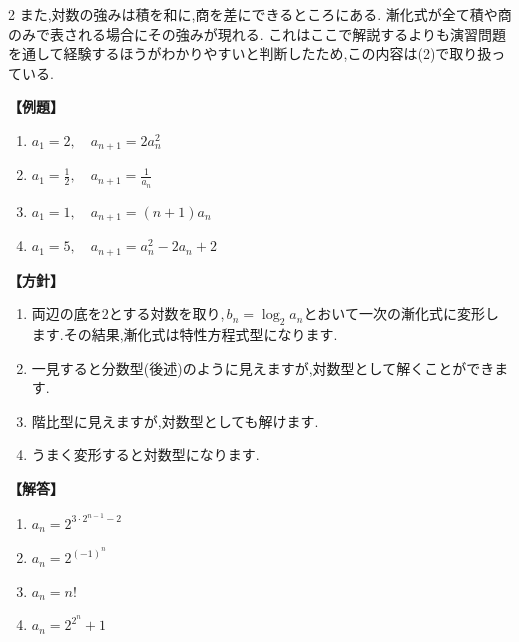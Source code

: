\documentclass[dvipdfmx,a4paper,11pt,fleqn,openany]{jsbook}
\begin{document}
\begin{multicols*}{2}
    また,対数の強みは積を和に,商を差にできるところにある.
    漸化式が全て積や商のみで表される場合にその強みが現れる.
    これはここで解説するよりも演習問題を通して経験するほうがわかりやすいと判断したため,この内容は(2)で取り扱っている.
  
    \noindent\textbf{【例題】}
    \begin{enumerate}[label=(\arabic*),parsep=3pt]
      \item $\displaystyle a_1=2,\quad a_{n+1}=2a_n^2$
      \item $\displaystyle a_1=\frac{1}{2},\quad a_{n+1}=\frac{1}{a_n}$
      \item $\displaystyle a_1=1,\quad a_{n+1}=(n+1)a_n$
      \item $\displaystyle a_1=5,\quad a_{n+1}=a_n^2-2a_n+2$
    \end{enumerate}

    \noindent\textbf{【方針】}
    \begin{enumerate}[label=(\arabic*),parsep=3pt]
      \item 両辺の底を$2$とする対数を取り,\,$b_n=\log_2a_n$とおいて一次の漸化式に変形します.その結果,漸化式は特性方程式型になります.
      \item 一見すると分数型(後述)のように見えますが,対数型として解くことができます.
      \item 階比型に見えますが,対数型としても解けます.
      \item うまく変形すると対数型になります.
    \end{enumerate}

    \noindent\textbf{【解答】}
    \begin{enumerate}[label=(\arabic*),parsep=3pt]
      \item $\displaystyle a_n=2^{3\cdot2^{n-1}-2}$
      \item $a_n=2^{(-1)^{n}}$
      \item $a_n=n!$
      \item $a_n=2^{2^n}+1$
    \end{enumerate}


\end{multicols*}
\end{document}
